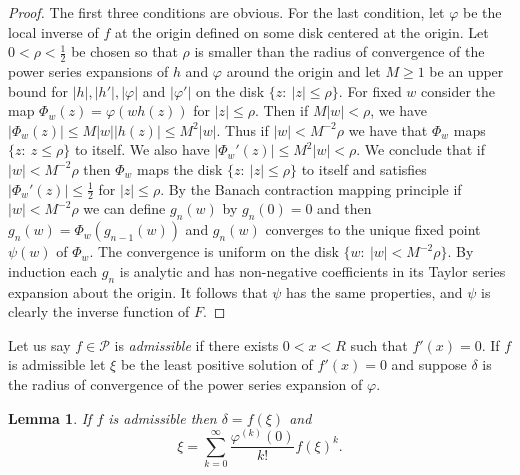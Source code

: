 \documentclass[12pt]{amsart}
\newtheorem{lemma}[thm]{Lemma}
\begin{document}
\begin{proof} The first three conditions are obvious.   For the last condition,
let $\varphi$ be the local inverse of $f$ at the origin defined on
some disk centered at the origin.  Let $0<\rho<\frac12$ be chosen
so that $\rho$ is smaller than the radius of convergence of the
power series expansions of $h$ and $\varphi$ around the origin and
let $M\ge 1$ be an upper bound for $|h|,|h'|,|\varphi|$ and
$|\varphi'|$ on the disk $ \{z:\ |z|\le \rho\}$.   For fixed $w$
consider the map $\Phi_w(z)= \varphi(wh(z))$ for $|z|\le \rho$.
Then if $M|w|<\rho$, we have $|\Phi_w(z)|\le M|w||h(z)|\le
M^2|w|$.  Thus if $|w|<M^{-2}\rho$ we have that $\Phi_w$ maps
$\{z:\ z\le \rho\}$ to itself. We also have $ |\Phi_w'(z)|\le
M^2|w|<\rho$. We conclude that if $|w|<M^{-2}\rho$ then $\Phi_w$
maps the disk $\{z:\ |z|\le \rho\}$ to itself and satisfies
$|\Phi_w'(z)|\le \frac12$ for $|z|\le \rho$. By the Banach
contraction mapping principle if $|w|<M^{-2}\rho$ we can define
$g_n(w)$ by $g_n(0)=0$ and then $g_n(w)=\Phi_w(g_{n-1}(w))$ and
$g_n(w)$ converges to the unique fixed point $\psi(w)$ of
$\Phi_w$. The convergence is uniform on the disk $\{w:\
|w|<M^{-2}\rho\}$.  By induction each $g_n$ is analytic and has
non-negative coefficients in its Taylor series expansion about the
origin.  It follows that $\psi$ has the same properties, and
$\psi$ is clearly the inverse function of $F$.\end{proof}






Let us say $f\in\mathcal P$ is {\it admissible} if there exists
$0<x<R$ such that $f'(x)=0$. If $f$ is admissible let $\xi$ be the
least positive solution of $f'(x)=0$ and suppose $\delta$ is the
radius of convergence of the power series expansion of $\varphi$.

\begin{lemma}\label{admissible} If $f$ is admissible then
$\delta=f(\xi)$ and $$\xi=
\sum_{k=0}^{\infty}\frac{\varphi^{(k)}(0)}{k!}f(\xi)^k.$$
\end{lemma}
\end{document}
